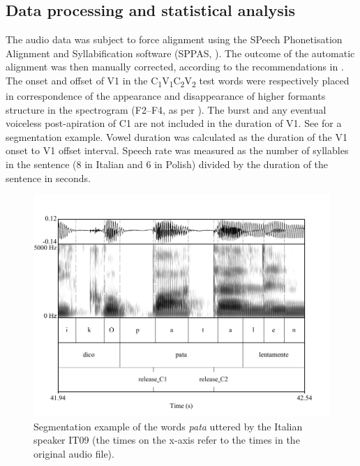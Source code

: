 \documentclass[preprint]{JASAnew}
\begin{document}
\hypertarget{data-processing-and-statistical-analysis}{%
\subsection{Data processing and statistical
analysis}\label{data-processing-and-statistical-analysis}}

\label{s:process}

The audio data was subject to force alignment using the SPeech
Phonetisation Alignment and Syllabification software (SPPAS,
\citealt{bigi2015}). The outcome of the automatic alignment was then
manually corrected, according to the recommendations in
\citet{machac2009}. The onset and offset of V1 in the
C\textsubscript{1}V\textsubscript{1}C\textsubscript{2}V\textsubscript{2}
test words were respectively placed in correspondence of the appearance
and disappearance of higher formants structure in the spectrogram
(F2--F4, as per \citealt{machac2009}). The burst and any eventual
voiceless post-apiration of C1 are not included in the duration of V1.
See  for a segmentation example. Vowel duration was
calculated as the duration of the V1 onset to V1 offset interval. Speech
rate was measured as the number of syllables in the sentence (8 in
Italian and 6 in Polish) divided by the duration of the sentence in
seconds.

\begin{figure}
  \centering
  \includegraphics[width=5in]{Figure1.pdf}
  \caption{Segmentation example of the words \textit{pata} uttered by the Italian speaker IT09 (the times on the x-axis refer to the times in the original audio file).}
  \label{f:segmentation}
\end{figure}
\end{document}
